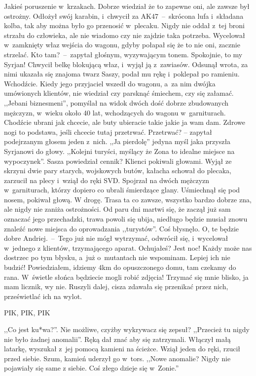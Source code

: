 \documentclass[../MAIN.tex]{subfiles}
\begin{document}
Jakieś poruszenie w~krzakach. Dobrze wiedział że to zapewne
oni, ale zawsze był ostrożny. Odłożył swój karabin, i~chwycił
za AK47~--~skrócona lufa i~składana kolba, tak aby można było
go
przenosić w~plecaku. Nigdy nie oddał z~tej broni strzału do
człowieka, ale nie wiadomo czy nie zajdzie taka potrzeba.
Wycelował w~zamknięty właz wejścia do wagonu, gdyby połapał się
że to nie oni, zacznie strzelać.
\sd
\xx Kto tam?~--~zapytał głośnym,
wyzywającym tonem.
\xx Spokojnie, to my Syrjan!
\qd
Chwycił belkę blokującą właz, i~wyjął ją z~zawiasów. Odsunął
wrota, za nimi
ukazała się znajoma twarz Saszy, podał mu rękę i~poklepał po
ramieniu.
\sd
\xx Wchodźcie.
\qd
Kiedy jego przyjaciel wszedł do wagonu, a~za nim dwójka
umówionych klientów, nie wiedział czy parsknąć śmiechem, czy
się załamać. ,,Jebani biznesmeni'', pomyślał na widok dwóch
dość
dobrze zbudowanych mężczyzn, w~wieku około 40 lat, wchodzących
do wagonu w~garniturach.
\sd
\xx Chodźcie ubrani jak chcecie, ale buty
ubieracie takie jakie ja wam dam. Zdrowe nogi to podstawa,
jeśli chcecie tutaj przetrwać.
\xx Przetrwać? -- zapytał podejrzanym głosem jeden z~nich.
\qd
,,Ja pierdolę'' jedyna myśl jaka przyszła Syrjanowi do głowy.
,,Kolejni turyści, myślący że Zona to idealne miejsce na
wypoczynek''.
\sd
\xx Sasza powiedział cennik?
\qd
Klienci pokiwali głowami. Wyjął
ze
skrzyni dwie pary starych, wojskowych butów, kałacha schował do
plecaka, zarzucił na plecy i~wziął do ręki SVD. Spojrzał na
dwóch mężczyzn w~garniturach, którzy dopiero co ubrali
śmierdzące glany. Uśmiechnął się pod nosem, pokiwał głową.
\sd
\xx W drogę.
\qd
Trasa ta co zawsze, wszystko bardzo dobrze zna, ale nigdy nie
zaniża ostrożności. Od paru dni martwi się, że zaczął już sam
oznaczać jego przechadzki, trawa powoli się ubija, niedługo
będzie musiał znowu znaleźć nowe miejsca do oprowadzania
,,turystów''. Coś błysnęło.
\sd
\xx O, te będzie dobre
Andriej.~--~Tego
już nie mógł wytrzymać, odwrócił się, i~wycelował w~jednego z
klientów, trzymającego aparat.
\xx Ochujałeś? Jest noc! Każdy może
nas dostrzec po tym błysku, a~już o~mutantach nie wspominam.
Lepiej ich nie budzić! Powiedziałem, idziemy 4km do
opuszczonego domu, tam czekamy do rana. W~świetle słońca
będziecie mogli robić zdjęcia! Trzymać się mnie blisko, ja mam
licznik, wy nie.
\qd
Ruszyli dalej, cisza zdawała się przenikać przez nich,
prześwietlać ich na wylot.\\
\centerline{
PIK, PIK, PIK}
 ,,Co jest ku*wa?''.
Nie
możliwe, czyżby wykrywacz się zepsuł? ,,Przecież tu nigdy nie
było żadnej anomalii''. Ręką dał znać aby się zatrzymali.
Włączył małą latarkę, wyszukał z~jej pomocą kamieni na ścieżce.
Wziął jeden do ręki, rzucił przed siebie. Szum, kamień uderzył
go w~tors. ,,Nowe anomalie? Nigdy nie pojawiały się same z
siebie. Coś złego dzieje się w~Zonie.''
\end{document}
